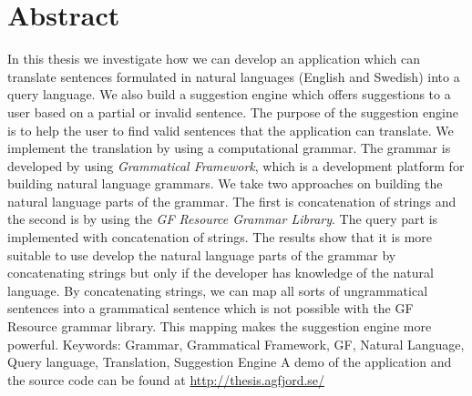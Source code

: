 \begingroup
\let\clearpage\relax
\let\cleardoublepage\relax
\let\cleardoublepage\relax

\chapter*{Abstract}
In this thesis we investigate how we can develop an application which can translate sentences formulated in natural languages (English and Swedish) into a query language. We also build a suggestion engine which offers suggestions to a user based on a partial or invalid sentence. The purpose of the suggestion engine is to help the user to find valid sentences that the application can translate.
\newline
\newline
We implement the translation by using a computational grammar. The grammar is developed by using \emph{Grammatical Framework}, which is a development platform for building natural language grammars. We take two approaches on building the natural language parts of the grammar. The first is concatenation of strings and the second is by using the \emph{GF Resource Grammar Library}. The query part is implemented with concatenation of strings.
\newline
\newline
The results show that it is more suitable to use develop the natural language parts of the grammar by concatenating strings but only if the developer has  knowledge of the natural language. By concatenating strings, we can map all sorts of ungrammatical sentences into a grammatical sentence which is not possible with the GF Resource grammar library. This mapping makes the suggestion engine more powerful.
\newline
\newline
Keywords: Grammar, Grammatical Framework, GF, Natural Language, Query language, Translation, Suggestion Engine
\newline
\newline
A demo of the application and the source code can be found at \url{http://thesis.agfjord.se/}

\endgroup			

\vfill